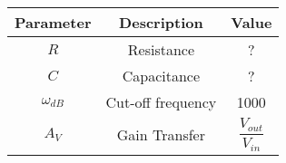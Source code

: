 \begin{tabular}{|c|c|c|}
    \hline
     Parameter & Description & Value \\
    \hline
     $R$ & Resistance & ?\\
     \hline
     $C$ & Capacitance  & ?\\
    \hline
    $\omega_{dB}$ & Cut-off frequency & 1000\\ 
   \hline
    $A_V$ & Gain Transfer & $\dfrac{ V_{out}}{V_{in}}$ \\
    \hline
\end{tabular}